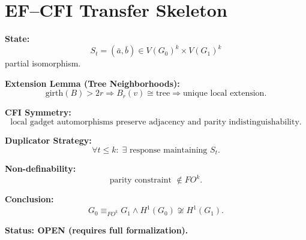 \documentclass{article}
\begin{document}
\section*{EF–CFI Transfer Skeleton}

\textbf{State:}
\[
S_t=(\bar a,\bar b)\in V(G_0)^k\times V(G_1)^k
\]
partial isomorphism.

\textbf{Extension Lemma (Tree Neighborhoods):}
\[
\text{girth}(B)>2r \Rightarrow
B_r(v)\cong \text{tree} \Rightarrow
\text{unique local extension}.
\]

\textbf{CFI Symmetry:}
\[
\text{local gadget automorphisms preserve adjacency and parity indistinguishability}.
\]

\textbf{Duplicator Strategy:}
\[
\forall t\le k:\;\exists\text{ response maintaining }S_t.
\]

\textbf{Non-definability:}
\[
\text{parity constraint }\notin FO^k.
\]

\textbf{Conclusion:}
\[
G_0\equiv_{FO^k}G_1 \land
H^1(G_0)\not\cong H^1(G_1).
\]

\textbf{Status: OPEN (requires full formalization).}
\end{document}
